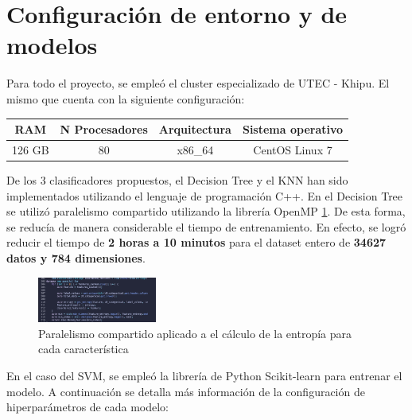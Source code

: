 \documentclass[conference]{IEEEtran}
\begin{document}
\section{Configuración de entorno y de modelos}
Para todo el proyecto, se empleó el cluster especializado de UTEC - Khipu. El mismo que cuenta con 
la siguiente configuración:

\begin{center}
  \begin{table}[ht]
    \centering
    \begin{tabular}{|c | c | c | c|}
    \hline
    RAM    & N Procesadores & Arquitectura & Sistema operativo \\
    \hline
    126 GB & 80             & x86\_64      & CentOS Linux 7    \\
    \hline
    \end{tabular}
  \end{table}
\end{center}

De los 3 clasificadores propuestos, el Decision Tree y el KNN han sido implementados utilizando el lenguaje
de programación C++. En el Decision Tree se utilizó paralelismo compartido
utilizando la librería OpenMP \ref{fig:openmp}. De esta forma, se reducía de manera considerable
el tiempo de entrenamiento. En efecto, se logró reducir el tiempo de \textbf{2 horas
a 10 minutos} para el dataset entero de \textbf{34627 datos y 784 dimensiones}.


\begin{figure}[ht]
    \centering
    \includegraphics[width=0.35\textwidth]{images/openmp.png}
    \caption{Paralelismo compartido aplicado a el cálculo de la entropía para cada característica}
    \label{fig:openmp}
\end{figure}

En el caso del SVM, se empleó la librería de Python Scikit-learn para entrenar el modelo.
A continuación se detalla más información de la configuración de hiperparámetros de cada modelo:
\end{document}
